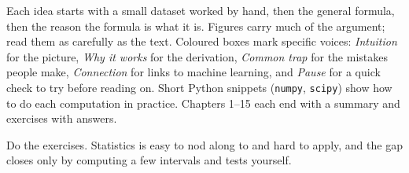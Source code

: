 Each idea starts with a small dataset worked by hand, then the general
formula, then the reason the formula is what it is. Figures carry much of the
argument; read them as carefully as the text. Coloured boxes mark specific
voices: \emph{Intuition} for the picture, \emph{Why it works} for the
derivation, \emph{Common trap} for the mistakes people make,
\emph{Connection} for links to machine learning, and \emph{Pause} for a quick
check to try before reading on. Short Python snippets
(\texttt{numpy}, \texttt{scipy}) show how to do each computation in practice.
Chapters 1--15 each end with a summary and exercises with answers.

Do the exercises. Statistics is easy to nod along to and hard to apply, and
the gap closes only by computing a few intervals and tests yourself.
